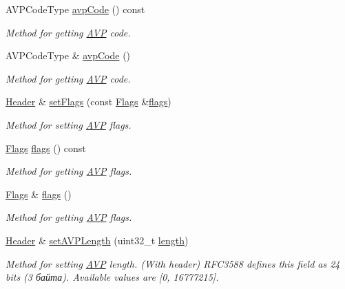 \begin{DoxyCompactItemize}
A\+V\+P\+Code\+Type \hyperlink{classDiameter_1_1AVP_1_1Header_a4cf4fb50efbf6e3f6de2b50b528ecc3b}{avp\+Code} () const
\begin{DoxyCompactList}\small\item\em Method for getting \hyperlink{classDiameter_1_1AVP}{A\+VP} code. \end{DoxyCompactList}\item 
A\+V\+P\+Code\+Type \& \hyperlink{classDiameter_1_1AVP_1_1Header_ad6b105892bcd3dcc952788299797bfa5}{avp\+Code} ()
\begin{DoxyCompactList}\small\item\em Method for getting \hyperlink{classDiameter_1_1AVP}{A\+VP} code. \end{DoxyCompactList}\item 
\hyperlink{classDiameter_1_1AVP_1_1Header}{Header} \& \hyperlink{classDiameter_1_1AVP_1_1Header_aa95dc9f6cb0461c20ffbec994cfb4fcd}{set\+Flags} (const \hyperlink{classDiameter_1_1AVP_1_1Header_1_1Flags}{Flags} \&\hyperlink{classDiameter_1_1AVP_1_1Header_ad100d91021d1db37cc270eefad43ccae}{flags})
\begin{DoxyCompactList}\small\item\em Method for setting \hyperlink{classDiameter_1_1AVP}{A\+VP} flags. \end{DoxyCompactList}\item 
\hyperlink{classDiameter_1_1AVP_1_1Header_1_1Flags}{Flags} \hyperlink{classDiameter_1_1AVP_1_1Header_ad100d91021d1db37cc270eefad43ccae}{flags} () const
\begin{DoxyCompactList}\small\item\em Method for getting \hyperlink{classDiameter_1_1AVP}{A\+VP} flags. \end{DoxyCompactList}\item 
\hyperlink{classDiameter_1_1AVP_1_1Header_1_1Flags}{Flags} \& \hyperlink{classDiameter_1_1AVP_1_1Header_acbebbb2ad082d7400ee9a0ebf105b55b}{flags} ()
\begin{DoxyCompactList}\small\item\em Method for getting \hyperlink{classDiameter_1_1AVP}{A\+VP} flags. \end{DoxyCompactList}\item 
\hyperlink{classDiameter_1_1AVP_1_1Header}{Header} \& \hyperlink{classDiameter_1_1AVP_1_1Header_a3d1f5e2e4f7779c6aead3ee8236f7e6d}{set\+A\+V\+P\+Length} (uint32\+\_\+t \hyperlink{classDiameter_1_1AVP_1_1Header_a9a097c1c12f4e81cc47b980a32e2881c}{length})
\begin{DoxyCompactList}\small\item\em Method for setting \hyperlink{classDiameter_1_1AVP}{A\+VP} length. (With header) R\+F\+C3588 defines this field as 24 bits (3 байта). Available values are \mbox{[}0, 16777215\mbox{]}. \end{DoxyCompactList}\item 

\end{DoxyCompactItemize}
